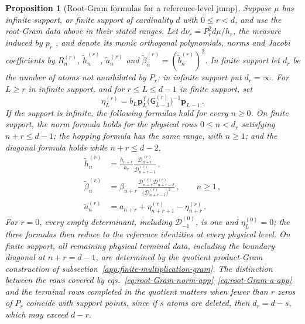\documentclass[a4paper,11pt]{article}
\def\dd{d}%
\newtheorem{proposition}{Proposition}[section]
\theoremstyle{definition}
\theoremstyle{remark}
\newcommand{\dd}{\mathrm d}
\begin{document}
\begin{proposition}[Root-Gram formulas for a reference-level jump]
\label{prop:root-Gram-Jacobi-app}
Suppose $\mu$ has infinite support, or finite support of cardinality
$d$ with $0\le r<d$, and use the root-Gram data above in their stated
ranges.  Let $\dd\nu_r=P_r^2\dd\mu/h_r$, the measure induced by $p_r$ \cite{GautschiLi1993}, and denote its monic orthogonal
polynomials, norms and Jacobi coefficients by $R_n^{(r)}$,
$\widetilde h_n^{(r)}$, $\widetilde a_n^{(r)}$ and
$\widetilde\beta_n^{(r)}=(\widetilde b_n^{(r)})^2$.  In finite
support let $d_r$ be the number of atoms not annihilated by $P_r$; in
infinite support put $d_r=\infty$.  For $L\ge r$ in infinite support,
and for $r\le L\le d-1$ in finite support, set
\begin{equation}
   \eta_L^{(r)}
   =b_L\boldsymbol p_L^{\mathsf T}
      \bigl(\mathsf G_{L-1}^{(r)}\bigr)^{-1}
      \boldsymbol p_{L-1}\,.
   \label{eq:root-Gram-eta-app}
\end{equation}
If the support is infinite, the following formulas hold for every
$n\ge0$.  On finite support, the norm formula holds for the physical rows
$0\le n<d_r$ satisfying $n+r\le d-1$; the hopping formula has the same
range, with $n\ge1$; and the diagonal formula holds while
$n+r\le d-2$,
\begin{align}
   \widetilde h_n^{(r)}
   &=\frac{h_{n+r}}{h_r}
      \frac{\mathcal D_{n+r}^{(r)}}
           {\mathcal D_{n+r-1}^{(r)}}\,,
   \label{eq:root-Gram-norm-app}\\
   \widetilde\beta_n^{(r)}
   &=\beta_{n+r}
      \frac{\mathcal D_{n+r}^{(r)}
            \mathcal D_{n+r-2}^{(r)}}
           {\bigl(\mathcal D_{n+r-1}^{(r)}\bigr)^2}\,,
   \qquad n\ge1\,,
   \label{eq:root-Gram-beta-app}\\
   \widetilde a_n^{(r)}
   &=a_{n+r}+\eta_{n+r+1}^{(r)}-\eta_{n+r}^{(r)}\,.
   \label{eq:root-Gram-a-app}
\end{align}
For $r=0$, every empty determinant, including $\mathcal D_{-1}^{(0)}$,
is one and $\eta_L^{(0)}=0$; the three formulas then reduce to the
reference identities at every physical level. On finite support, all
remaining physical terminal data, including the boundary diagonal at
$n+r=d-1$, are determined by the quotient product-Gram construction of
subsection~\ref{app:finite-multiplication-gram}.  The distinction between the rows covered by eqs.~\eqref{eq:root-Gram-norm-app}--\eqref{eq:root-Gram-a-app} and the terminal rows completed in the quotient matters when fewer than $r$ zeros of $P_r$ coincide with support points, since if $s$ atoms are deleted, then $d_r=d-s$, which may exceed $d-r$.
\end{proposition}
\end{document}

